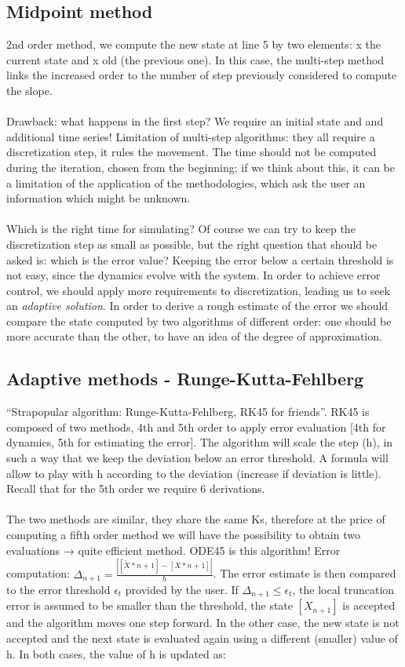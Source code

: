   \subsection{Midpoint method}
  2nd order method, we compute the new state at line 5 by two elements: x the current state and x old (the previous one).
  In this case, the multi-step method links the increased order to the number of step previously considered to compute the slope.
  \\
  \\
  \noindent
  Drawback: what happens in the first step? We require an initial state and and additional time series! Limitation of multi-step algorithms: they all require a discretization step, it rules the movement.
  The time should not be computed during the iteration, chosen from the beginning; if we think about this, it can be a limitation of the application of the methodologies, which ask the user an information which might be unknown.
  \\
  \\
  \noindent
  Which is the right time for simulating? Of course we can try to keep the discretization step as small as possible, but the right question that should be asked is: which is the error value? Keeping the error below a certain threshold is not easy, since the dynamics evolve with the system.
  In order to achieve error control, we should apply more requirements to discretization, leading us to seek an \emph{adaptive solution}.
  In order to derive a rough estimate of the error we should compare the state computed by two algorithms of different order: one should be more accurate than the other, to have an idea of the degree of approximation.

  \subsection{Adaptive methods - Runge-Kutta-Fehlberg}
  ``Strapopular algorithm: Runge-Kutta-Fehlberg, RK45 for friends''.
  RK45 is composed of two methods, 4th and 5th order to apply error evaluation {[}4th for dynamics, 5th for estimating the error{]}.
  The algorithm will scale the step (h), in such a way that we keep the deviation below an error threshold.
  A formula will allow to play with h according to the deviation (increase if deviation is little).
  Recall that for the 5th order we require 6 derivations.
  \\
  \\
  \noindent
  The two methods are similar, they share the same Ks, therefore at the price of computing a fifth order method we will have the possibility to obtain two evaluations → quite efficient method.
  ODE45 is this algorithm! Error computation: $\Delta_{n+1}=\frac{|[\tilde{X}*{n+1}]-[X*{n+1}]|}{h}$.
  The error estimate is then compared to the error threshold $\epsilon_t$ provided by the user.
  If $\Delta_{n+1}\leq \epsilon_t$, the local truncation error is assumed to be smaller than the threshold, the state $[X_{n+1}]$ is accepted and the algorithm moves one step forward.
  In the other case, the new state is not accepted and the next state is evaluated again using a different (smaller) value of h.
  In both cases, the value of h is updated as:


